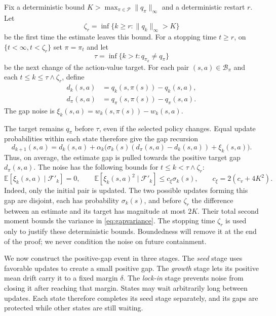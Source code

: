 \begin{definition}
\label{def: gap variables}
Fix a deterministic bound $K>\max_{\pi\in\mathcal P}\|q_\pi\|_\infty$ and a deterministic restart $r$. Let
\[
\zeta_r=\inf\{k\ge r:\|q_k\|_\infty>K\}
\]
be the first time the estimate leaves this bound.
For a stopping time $t\ge r$, on $\{t<\infty,t<\zeta_r\}$ set $\pi=\pi_t$ and let
\[
\tau=\inf\{k>t:q_{\pi_k}\ne q_\pi\}
\]
be the next change of the action-value target.
For each pair $(s,a)\in\mathcal B_\pi$ and each $t\le k\le\tau\wedge\zeta_r$, define
\begin{align}
\label{eq:gaps}
d_k(s,a)&=q_k(s,\pi(s))-q_k(s,a),\\
d_\pi(s,a)&=q_\pi(s,\pi(s))-q_\pi(s,a).
\end{align}
The gap noise is $\xi_k(s,a)=w_k(s,\pi(s))-w_k(s,a)$.
\end{definition}

The target remains $q_\pi$ before $\tau$, even if the selected policy changes. Equal update probabilities within each state therefore give the gap recursion
\begin{equation}
\label{eq:gapdrift}
d_{k+1}(s,a)=d_k(s,a)+\alpha_k\big(\sigma_k(s)(d_\pi(s,a)-d_k(s,a))+\xi_k(s,a)\big).
\end{equation}
Thus, on average, the estimate gap is pulled towards the positive target gap $d_\pi(s,a)$. The noise has the following bounds for $t\le k<\tau\wedge\zeta_r$:
\begin{equation}
\label{eq:gapvariance}
\mathbb E[\xi_k(s,a)\mid\mathcal F'_k]=0,
\qquad
\mathbb E[\xi_k(s,a)^2\mid\mathcal F'_k]\le c_\xi\sigma_k(s),
\qquad c_\xi=2(c_v+4K^2).
\end{equation}
Indeed, only the initial pair is updated. The two possible updates forming this gap are disjoint, each has probability $\sigma_k(s)$, and before $\zeta_r$ the difference between an estimate and its target has magnitude at most $2K$. Their total second moment bounds the variance in \eqref{eq:gapvariance}.
The stopping time $\zeta_r$ is used only to justify these deterministic bounds. Boundedness will remove it at the end of the proof; we never condition the noise on future containment.

We now construct the positive-gap event in three stages. The \emph{seed} stage uses favorable updates to create a small positive gap. The \emph{growth} stage lets its positive mean drift carry it to a fixed margin $\delta$. The \emph{lock-in} stage prevents noise from closing it after reaching that margin. States may wait arbitrarily long between updates. Each state therefore completes its seed stage separately, and its gaps are protected while other states are still waiting.

